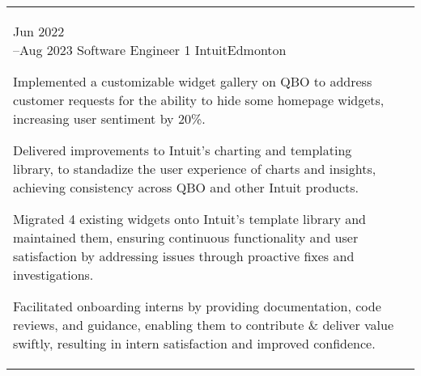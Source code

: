 \begin{tabular}{@{\raggedright}p{} |>{\raggedright\arraybackslash}p{}}
    \cvevent{Jun 2022\newline --Aug 2023}
    {Software Engineer 1}
    {Intuit}{Edmonton}
    {\begin{tabitemize}
        \item Implemented a customizable widget gallery on QBO to address customer requests for the ability to hide some homepage widgets, increasing user sentiment by 20\%.
        \item Delivered improvements to Intuit's charting and templating library, to standadize the user experience of charts and insights, achieving consistency across QBO and other Intuit products. 
        \item Migrated 4 existing widgets onto Intuit's template library and maintained them, ensuring continuous functionality and user satisfaction by addressing issues through proactive fixes and investigations.
        \item Facilitated onboarding interns by providing documentation, code reviews, and guidance, enabling them to contribute \& deliver value swiftly, resulting in intern satisfaction and improved confidence.
        \vspace{0.5em}
    \end{tabitemize}
    } \\

\end{tabular}

